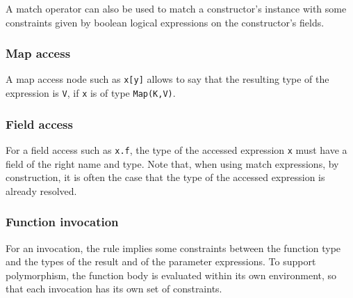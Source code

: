 \documentclass[11pt]{article}
\begin{document}
\begin{center}
  
\DP
\end{center}

A match operator can also be used to match a constructor's instance with some constraints given by boolean logical expressions on the constructor's fields.

\begin{center}
 \RightLabel{$ [ \{ freevars(e_i)=\emptyset \}_{i \in [1..n]} ] $}
\DP
\end{center}

\subsubsection{Map access}

A map access node such as \texttt{x[y]} allows to say that the resulting type of the expression is \texttt{V}, if \texttt{x} is of type \texttt{Map(K,V)}.

\begin{center}
 
\DP
\end{center}

\subsubsection{Field access}

For a field access such as \texttt{x.f}, the type of the accessed expression \texttt{x} must have a field of the right name and type. Note that, when using match expressions, by construction, it is often the case that the type of the accessed expression is already resolved.

\begin{center}
\DP
\end{center}

\subsubsection{Function invocation}

For an invocation, the rule implies some constraints between the function type and the types of the result and of the parameter expressions. To support polymorphism, the function body is evaluated within its own environment, so that each invocation has its own set of constraints.
\end{document}
